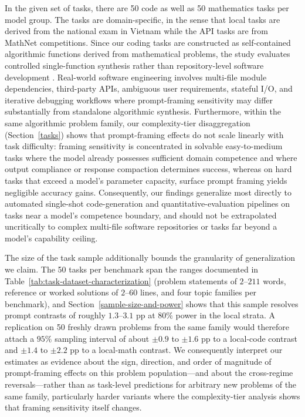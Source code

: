 \documentclass[a4paper,fleqn]{cas-sc}
\begin{document}
In the given set of tasks, there are 50 code as well as 50 mathematics tasks per model group. The tasks are domain-specific, in the sense that local tasks are derived from the national exam in Vietnam while the API tasks are from MathNet competitions. Since our coding tasks are constructed as self-contained algorithmic functions derived from mathematical problems, the study evaluates controlled single-function synthesis rather than repository-level software development \citep{jimenez2024swebench}. Real-world software engineering involves multi-file module dependencies, third-party APIs, ambiguous user requirements, stateful I/O, and iterative debugging workflows where prompt-framing sensitivity may differ substantially from standalone algorithmic synthesis. Furthermore, within the same algorithmic problem family, our complexity-tier disaggregation (Section~\ref{tasks}) shows that prompt-framing effects do not scale linearly with task difficulty: framing sensitivity is concentrated in solvable easy-to-medium tasks where the model already possesses sufficient domain competence and where output compliance or response compaction determines success, whereas on hard tasks that exceed a model's parameter capacity, surface prompt framing yields negligible accuracy gains. Consequently, our findings generalize most directly to automated single-shot code-generation and quantitative-evaluation pipelines on tasks near a model's competence boundary, and should not be extrapolated uncritically to complex multi-file software repositories or tasks far beyond a model's capability ceiling.

The size of the task sample additionally bounds the granularity of generalization we claim. The 50 tasks per benchmark span the ranges documented in Table~\ref{tab:task-dataset-characterization} (problem statements of $2$--$211$ words, reference or worked solutions of $2$--$60$ lines, and four topic families per benchmark), and Section~\ref{sample-size-and-power} shows that this sample resolves prompt contrasts of roughly $1.3$--$3.1$ pp at $80\%$ power in the local strata. A replication on 50 freshly drawn problems from the same family would therefore attach a $95\%$ sampling interval of about $\pm 0.9$ to $\pm 1.6$ pp to a local-code contrast and $\pm 1.4$ to $\pm 2.2$ pp to a local-math contrast. We consequently interpret our estimates as evidence about the sign, direction, and order of magnitude of prompt-framing effects on this problem population---and about the cross-regime reversals---rather than as task-level predictions for arbitrary new problems of the same family, particularly harder variants where the complexity-tier analysis shows that framing sensitivity itself changes.
\end{document}
